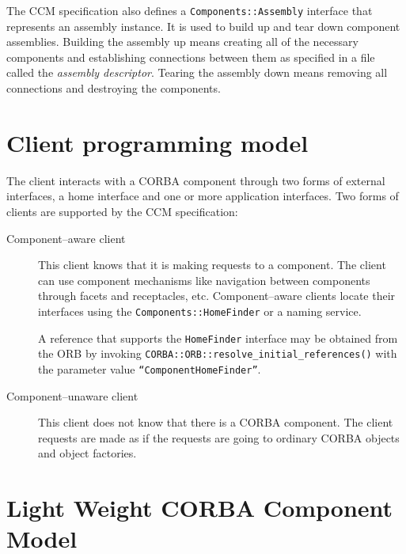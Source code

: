 The CCM specification also defines a {\tt Components::Assembly} interface that
represents an assembly instance. It is used to build up and tear down component
assemblies. Building the assembly up means creating all of the necessary
components and establishing connections between them as specified in a file
called the {\it assembly descriptor\/}. Tearing the assembly down means removing
all connections and destroying the components.




\section{Client programming model}

The client interacts with a CORBA component through two forms of external
interfaces, a home interface and one or more application interfaces. Two forms
of clients are supported by the CCM specification:

\begin{description}
\item [Component--aware client]
This client knows that it is making requests to a component. The client can use
component mechanisms like navigation between components through facets and
receptacles, etc. Component--aware clients locate their interfaces using the
{\tt Components::HomeFinder} or a naming service.

A reference that supports the {\tt HomeFinder} interface may be obtained from
the ORB by invoking {\tt CORBA::ORB::resolve\_initial\_references()} with the
parameter value {\tt ``ComponentHomeFinder''}.

\item [Component--unaware client]
This client does not know that there is a CORBA component. The client requests
are made as if the requests are going to ordinary CORBA objects and object
factories.
\end{description}


\newpage
\section{Light Weight CORBA Component Model}

